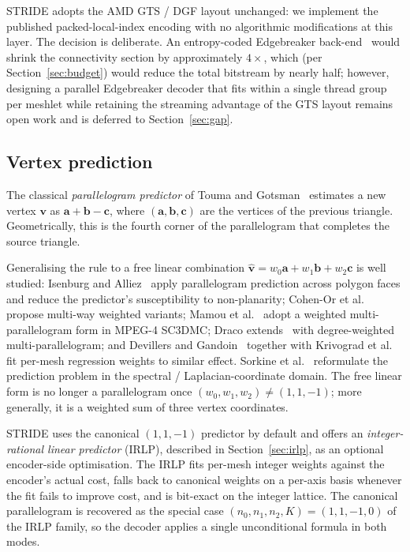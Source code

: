 \documentclass[pdflatex,sn-vancouver-num]{sn-jnl}%
\theoremstyle{thmstyleone}%
\theoremstyle{thmstyletwo}%
\theoremstyle{thmstylethree}%
\begin{document}
STRIDE adopts the AMD GTS / DGF layout unchanged: we implement the published packed-local-index encoding with no algorithmic modifications at this layer. The decision is deliberate. An entropy-coded Edgebreaker back-end~\cite{ref04_edgebreaker_1999,ref35_szymczak_2003} would shrink the connectivity section by approximately $4\times$, which (per Section~\ref{sec:budget}) would reduce the total bitstream by nearly half; however, designing a parallel Edgebreaker decoder that fits within a single thread group per meshlet while retaining the streaming advantage of the GTS layout remains open work and is deferred to Section~\ref{sec:gap}.

\subsection{Vertex prediction}\label{sec:rw_pred}

The classical \emph{parallelogram predictor} of Touma and Gotsman~\cite{ref05_touma_gotsman_1998} estimates a new vertex $\mathbf{v}$ as $\mathbf{a} + \mathbf{b} - \mathbf{c}$, where $(\mathbf{a}, \mathbf{b}, \mathbf{c})$ are the vertices of the previous triangle. Geometrically, this is the fourth corner of the parallelogram that completes the source triangle.

Generalising the rule to a free linear combination $\hat{\mathbf{v}} = w_0 \mathbf{a} + w_1 \mathbf{b} + w_2 \mathbf{c}$ is well studied: Isenburg and Alliez~\cite{ref06_isenburg_alliez_2002} apply parallelogram prediction across polygon faces and reduce the predictor's susceptibility to non-planarity; Cohen-Or et al.~\cite{ref07_cohenor_2002} propose multi-way weighted variants; Mamou et al.~\cite{ref08_tfan_2009} adopt a weighted multi-parallelogram form in MPEG-4 SC3DMC; Draco extends~\cite{ref05_touma_gotsman_1998} with degree-weighted multi-parallelogram; and Devillers and Gandoin~\cite{ref12_devillers_gandoin_2000} together with Krivograd et al.~\cite{ref13_krivograd_2008} fit per-mesh regression weights to similar effect. Sorkine et al.~\cite{ref21_sorkine_2003} reformulate the prediction problem in the spectral / Laplacian-coordinate domain. The free linear form is no longer a parallelogram once $(w_0, w_1, w_2) \ne (1, 1, -1)$; more generally, it is a weighted sum of three vertex coordinates.

STRIDE uses the canonical $(1, 1, -1)$ predictor by default and offers an \emph{integer-rational linear predictor} (IRLP), described in Section~\ref{sec:irlp}, as an optional encoder-side optimisation. The IRLP fits per-mesh integer weights against the encoder's actual cost, falls back to canonical weights on a per-axis basis whenever the fit fails to improve cost, and is bit-exact on the integer lattice. The canonical parallelogram is recovered as the special case $(n_0, n_1, n_2, K) = (1, 1, -1, 0)$ of the IRLP family, so the decoder applies a single unconditional formula in both modes.
\end{document}
